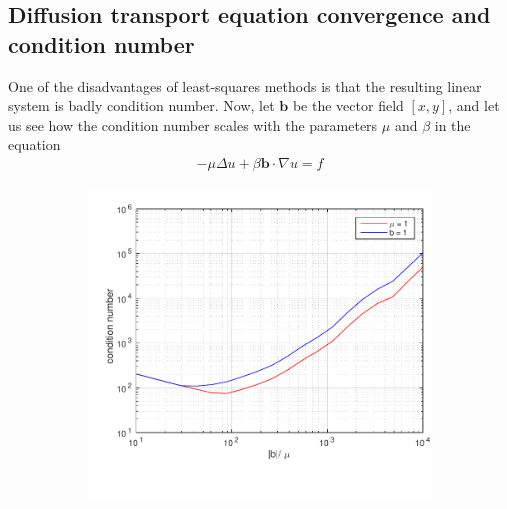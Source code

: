 \subsection{Diffusion transport equation convergence and condition number}
One of the disadvantages of least-squares methods is that the resulting
linear system is badly condition number. Now, let $\mathbf{b}$ be the vector field $[x,y]$, and let us see how the condition number scales with the parameters $\mu$ and $\beta$ in the equation 
\begin{align}
	-\mu \Delta u + \beta \mathbf{b} \cdot \nabla u = f
	\label{eq:difftransForConditionNumberPlotting}
\end{align}
%
\begin{figure}[h!]
  \centering
  \begin{subfigure}[b]{0.48\textwidth}
		\includegraphics[width=\textwidth]{Figures/Spec_difftrans_ConditionNumber.pdf}
  \end{subfigure}%
  \quad
  \begin{subfigure}[b]{0.48\textwidth}

\end{subfigure}
\end{figure}
